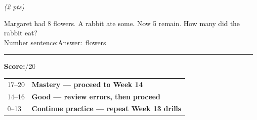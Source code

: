 \documentclass[12pt, letterpaper]{article}
\begin{document}
\bigskip\bigskip
{} \hfill \textit{(2 pts)}

\bigskip
\prob Margaret had 8 flowers. A rabbit ate some. Now 5 remain.
How many did the rabbit eat?\\[10pt]
\hspace{2em}Number sentence:\ansblanklg \quad Answer:\ansblank\ flowers

\bigskip
{\color{sd-gold}\rule{\linewidth}{0.5pt}}

\begin{instructbox}
\textbf{Score:}\underline{\hspace{1.5cm}}/20\hfill
\begin{tabular}{@{}ll@{}}
17--20 & \textbf{\color{sd-green}Mastery — proceed to Week 14}\\
14--16 & \textbf{\color{sd-gold}Good — review errors, then proceed}\\
0--13  & \textbf{\color{red!70!black}Continue practice — repeat Week 13 drills}
\end{tabular}
\end{instructbox}
\end{document}
